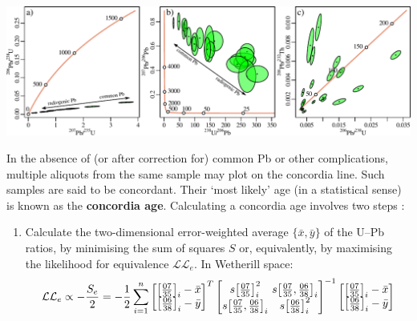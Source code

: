 \begin{refsection}
\noindent\includegraphics[width=\textwidth]{../figures/3xconcordia.pdf}
\begingroup {}\endgroup

In the absence of (or after correction for) common Pb or other
complications, multiple aliquots from the same sample may plot on the
concordia line. Such samples are said to be concordant. Their `most
likely' age (in a statistical sense) is known as the \textbf{concordia
  age}. Calculating a concordia age involves two steps
\citep{ludwig1998}:

\begin{enumerate}
  \item Calculate the two-dimensional error-weighted average
    $\{\bar{x},\bar{y}\}$ of the U--Pb ratios, by minimising the sum
    of squares $S$ or, equivalently, by maximising the likelihood for
    equivalence $\mathcal{LL}_e$. In Wetherill space:
    \begin{equation}
      \mathcal{LL}_e \propto - \frac{S_e}{2} =
      -\frac{1}{2}\sum\limits_{i=1}^{n} \left[
      \begin{array}{@{}c@{}}
        \left[\frac{07}{35}\right]_i-\bar{x}\\
        \left[\frac{06}{38}\right]_i-\bar{y}
      \end{array}
      \right]^T
    \left[
      \begin{array}{@{}c@{~}c@{}}
        s\!\left[\frac{07}{35}\right]_i^2 &
        s\!\left[\frac{07}{35},\frac{06}{38}\right]_i\\
        s\!\left[\frac{07}{35},\frac{06}{38}\right]_i &
        s\!\left[\frac{06}{38}\right]_i^2
      \end{array}
      \right]^{-1}
    \left[
      \begin{array}{@{}c@{}}
        \left[\frac{07}{35}\right]_i-\bar{x}\\
        \left[\frac{06}{38}\right]_i-\bar{y}
      \end{array}
      \right]    
    \end{equation}


\end{enumerate}
\end{refsection}
